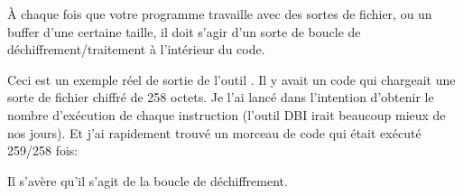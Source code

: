 
À chaque fois que votre programme travaille avec des sortes de fichier, ou un buffer
d'une certaine taille, il doit s'agir d'un sorte de boucle de déchiffrement/traitement
à l'intérieur du code.

Ceci est un exemple réel de sortie de l'outil \tracer.
Il y avait un code qui chargeait une sorte de fichier chiffré de 258 octets.
Je l'ai lancé dans l'intention d'obtenir le  nombre d'exécution de chaque instruction
(l'outil \ac{DBI} irait beaucoup mieux de nos jours).
Et j'ai rapidement trouvé un morceau de code qui était exécuté 259/258 fois:



Il s'avère qu'il s'agit de la boucle de déchiffrement.

